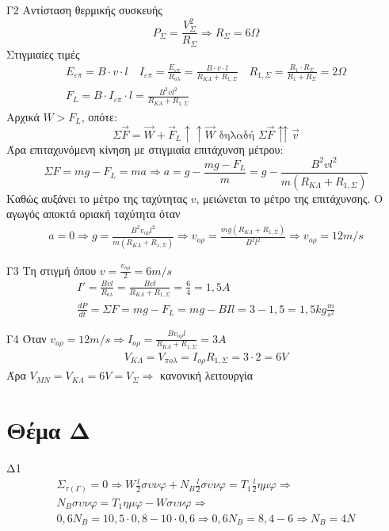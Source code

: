 \documentclass[greek]{beamer}
\begin{document}
\begin{frame}{Γ2}
 \begingroup
 \tiny%
 Αντίσταση θερμικής συσκευής
 $$P_Σ=\frac{V_Σ^2}{R_Σ}\Rightarrow R_Σ=6Ω$$
 Στιγμιαίες τιμές
 \begin{gather*}
  Ε_{επ}=B\cdot v \cdot l \quad I_{επ}=\frac{Ε_{επ}}{R_{ολ}}=\frac{B\cdot v \cdot l}{R_{ΚΛ}+R_{1,Σ}} \quad R_{1,Σ}=\frac{R_1\cdot R_Σ}{R_1+R_Σ}=2Ω \\
  F_L=B\cdot I_{επ} \cdot l=\frac{B^2vl^2}{R_{ΚΛ}+R_{1,Σ}}
 \end{gather*}
 Αρχικά $W>F_L$, οπότε:
 $$  Σ\overrightarrow{F}=\overrightarrow{W}+\overrightarrow{F}_L\uparrow\uparrow\overrightarrow{W} \text{ δηλαδή } Σ\overrightarrow{F} \upuparrows \overrightarrow{v}$$
 Άρα επιταχυνόμενη κίνηση με στιγμιαία επιτάχυνση μέτρου:
 $$ΣF=mg-F_L=ma\Rightarrow a=g-\frac{mg-F_L}{m}=g-\frac{B^2vl^2}{m\left(R_{ΚΛ}+R_{1,Σ}\right)}$$
 Καθώς αυξάνει το μέτρο της ταχύτητας $v$, μειώνεται το μέτρο της επιτάχυνσης. Ο αγωγός αποκτά οριακή ταχύτητα όταν
 \begin{gather*}
  a=0\Rightarrow g=\frac{B^2v_{ορ}l^2}{m\left(R_{ΚΛ}+R_{1,Σ}\right)}\Rightarrow v_{ορ}=\frac{mg\left(R_{ΚΛ}+R_{1,Σ}\right)}{B^2l^2}\Rightarrow v_{ορ}=12m/s
 \end{gather*}
 \endgroup

\end{frame}

\begin{frame}{Γ3}
 Τη στιγμή όπου $v=\frac{v_{ορ}}{2}=6m/s$
 \begin{gather*}
  I'=\frac{Bvl}{R_{ολ}}=\frac{Bvl}{R_{ΚΛ}+R_{1,Σ}}=\frac{6}{4}=1,5A \\
  \frac{dP}{dt}=ΣF=mg-F_L=mg-BIl=3-1,5=1,5kg\frac{m}{s^2}
 \end{gather*}

\end{frame}

\begin{frame}{Γ4}
 Όταν $v_{ορ}=12m/s\Rightarrow I_{ορ}=\frac{Bv_{ορ}l}{R_{ΚΛ}+R_{1,Σ}}=3A$
 \begin{gather*}
  V_{ΚΛ}=V_{πολ}=I_{ορ}R_{1,Σ}=3\cdot 2=6V
 \end{gather*}
 Άρα $V_{ΜΝ}=V_{ΚΛ}=6V=V_Σ\Rightarrow$ κανονική λειτουργία
\end{frame}

\section{Θέμα Δ}
\begin{frame}{Δ1}
 \begin{gather*}
  Σ_{τ(Γ)}=0\Rightarrow W\frac{l}{2}συνφ+N_B\frac{l}{2}συνφ=T_1\frac{l}{2}ημφ \Rightarrow \\
  N_Bσυνφ=T_1ημφ-Wσυνφ \Rightarrow \\
  0,6N_B=10,5\cdot 0,8-10\cdot 0,6 \Rightarrow 0,6N_B=8,4-6\Rightarrow N_B=4N
 \end{gather*}
\end{frame}
\end{document}
